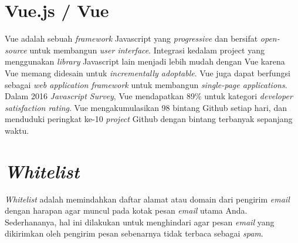 	\section{  Vue.js / Vue}
	  Vue adalah sebuah \textit{framework} Javascript yang \textit{progressive} dan bersifat \textit{open-source} untuk membangun \textit{user interface}. Integrasi kedalam project yang menggunakan \textit{library } Javascript lain menjadi lebih mudah dengan Vue karena Vue memang didesain untuk \textit{incrementally adoptable}. Vue juga dapat berfungsi sebagai \textit{web application framework} untuk membangun  \textit{single-page applications}.
	  \\ \indent
	  Dalam 2016 \textit{Javascript Survey}, Vue mendapatkan 89\% untuk kategori \textit{developer satisfaction rating}. Vue mengakumulasikan 98 bintang Github setiap hari, dan menduduki peringkat ke-10 \textit{project} Github dengan bintang terbanyak sepanjang waktu\cite{wikipedia_vue.js_2017}.
	
	\section{ \textit{Whitelist}}
	\textit{Whitelist} adalah memindahkan daftar alamat atau domain dari pengirim \textit{email} dengan harapan agar muncul pada kotak pesan \textit{email} utama Anda. Sederhananya, hal ini dilakukan untuk menghindari agar pesan \textit{email} yang dikirimkan oleh pengirim pesan sebenarnya tidak terbaca sebagai \textit{spam}\cite{wikipedia_sendgrid_2017}.
